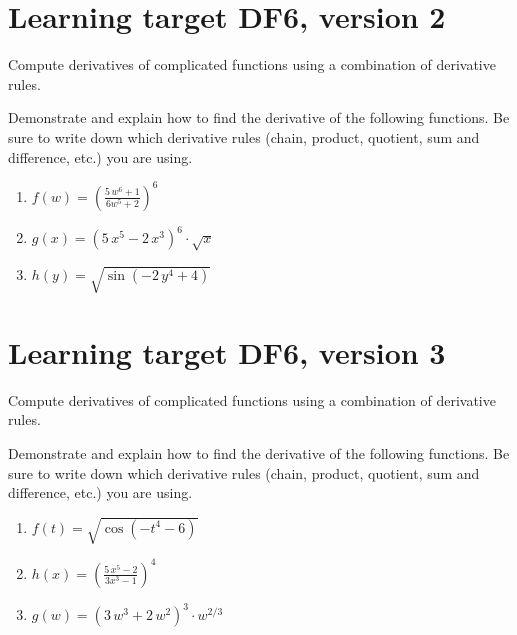 \pagebreak

\section{Learning target DF6, version 2}

Compute derivatives of complicated functions using a combination of derivative rules.

\hrulefill

Demonstrate and explain how to find the derivative of the following functions. Be sure to write down which derivative rules (chain, product, quotient, sum and difference, etc.) you are using.

\begin{enumerate}
    \item \(f(w) = \left( \frac{5 \, w^{6} + 1}{6w^5 + 2} \right)^{ 6 }\)
    \vfill
    \item \(g(x) = {\left(5 \, x^{5} - 2 \, x^{3}\right)}^{6}\cdot  \sqrt{x}\)
    \vfill
    \item \(h(y) = \sqrt{\sin\left(-2 \, y^{4} + 4\right)}\)
    \vfill
\end{enumerate}

\pagebreak

\section{Learning target DF6, version 3}

Compute derivatives of complicated functions using a combination of derivative rules.

\hrulefill

Demonstrate and explain how to find the derivative of the following functions. Be sure to write down which derivative rules (chain, product, quotient, sum and difference, etc.) you are using.

\begin{enumerate}
    \item \(f(t) = \sqrt{\cos\left(-t^{4} - 6\right)}\)
    \vfill
    \item \(h(x) = \left( \frac{5 \, x^{5} - 2}{3 x^{3} - 1} \right)^{ 4 }\)
    \vfill
    \item \(g(w) = {\left(3 \, w^{3} + 2 \, w^{2}\right)}^{3} \cdot w^{2/3}\)
    \vfill
\end{enumerate}

